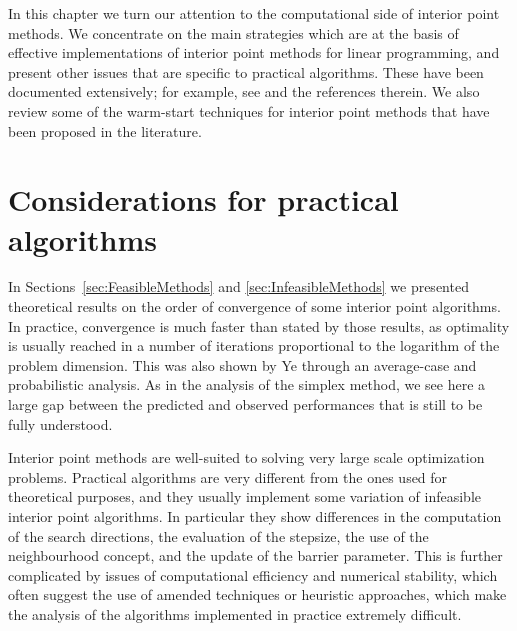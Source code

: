 
%
%
\label{ch:PracticalIpm}

In this chapter we turn our attention to the computational side of
interior point methods. We concentrate on the main strategies which are
at the basis of effective implementations of interior point methods
for linear programming, and present other issues that are specific
to practical algorithms.
These have been documented extensively; for example, see
\cite{AndersenGondzioMeszarosXu,GondzioTerlaky,ipm:Wright97} 
and the references therein.
We also review some of the warm-start techniques for interior point methods
that have been proposed in the literature.


%
%
\section{Considerations for practical algorithms}

In Sections~\ref{sec:FeasibleMethods} and \ref{sec:InfeasibleMethods}
we presented theoretical
results on the order of convergence of some interior point algorithms.
In practice, convergence is much faster than stated by those results, as
optimality is usually reached in a number of iterations 
proportional to the logarithm of the problem dimension. 
This was also shown by Ye \cite[Chapter~6]{Ye97} through an
average-case and probabilistic analysis.
As in the analysis of the simplex method, we see here a large
gap between the predicted and observed performances that is still to
be fully understood.

Interior point methods are well-suited to solving very
large scale optimization problems.
Practical algorithms are very different from the ones used for
theoretical purposes, and they usually implement some variation
of infeasible interior point algorithms. In particular they show
differences in the computation of the search directions, 
the evaluation of the stepsize, 
the use of the neighbourhood concept, and the update of the
barrier parameter.
This is further complicated by issues of computational efficiency
and numerical stability, which often suggest the use of amended
techniques or heuristic approaches, which make
the analysis of the algorithms implemented in practice extremely difficult.

